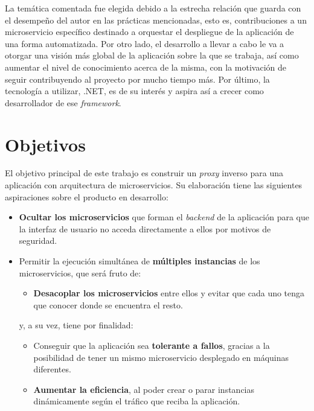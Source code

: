\documentclass[11pt,spanish,listoffigures]{tfgetsinf}
\begin{document}
La temática comentada fue elegida debido a la estrecha relación que guarda con el desempeño del autor en las prácticas mencionadas, esto es, contribuciones a un microservicio específico destinado a orquestar el despliegue de la aplicación de una forma automatizada. Por otro lado, el desarrollo a llevar a cabo le va a otorgar una visión más global de la aplicación sobre la que se trabaja, así como aumentar el nivel de conocimiento acerca de la misma, con la motivación de seguir contribuyendo al proyecto por mucho tiempo más. Por último, la tecnología a utilizar, .NET, es de su interés y aspira así a crecer como desarrollador de ese \emph{framework}.


	\section{Objetivos}

El objetivo principal de este trabajo es construir un \emph{proxy} inverso para una aplicación con arquitectura de microservicios. Su elaboración tiene las siguientes aspiraciones sobre el producto en desarrollo:

\begin{itemize}

	\item \textbf{Ocultar los microservicios} que forman el \emph{backend} de la aplicación para que la interfaz de usuario no acceda directamente a ellos por motivos de seguridad.

	\item Permitir la ejecución simultánea de \textbf{múltiples instancias} de los microservicios, que será fruto de:

	\begin{itemize}

		\item \textbf{Desacoplar los microservicios} entre ellos y evitar que cada uno tenga que conocer donde se encuentra el resto.

	\end{itemize}	

	y, a su vez, tiene por finalidad:

	\begin{itemize}

		\item Conseguir que la aplicación sea \textbf{tolerante a fallos}, gracias a la posibilidad de tener un mismo microservicio desplegado en máquinas diferentes.

		\item \textbf{Aumentar la eficiencia}, al poder crear o parar instancias dinámicamente según el tráfico que reciba la aplicación.

	\end{itemize}

\end{itemize}
\end{document}
